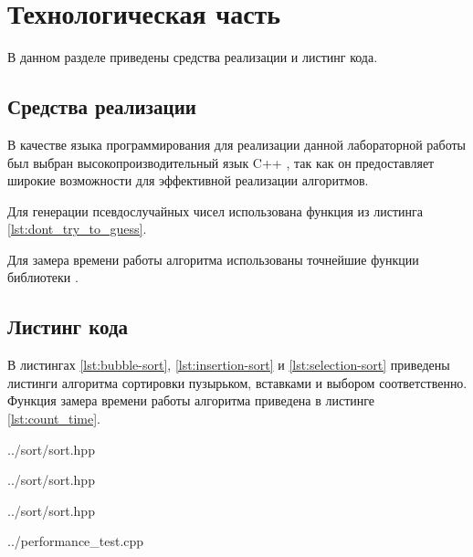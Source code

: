 \chapter{Технологическая часть}

В данном разделе приведены средства реализации и листинг кода.

\section{Средства реализации}

В качестве языка программирования для реализации данной лабораторной работы был выбран высокопроизводительный язык C++ \cite{cpp17}, так как он предоставляет широкие возможности для эффективной реализации алгоритмов.

Для генерации псевдослучайных чисел использована функция из листинга \ref{lst:dont_try_to_guess}.

Для замера времени работы алгоритма использованы точнейшие функции библиотеки .

\section{Листинг кода}

В листингах \ref{lst:bubble-sort}, \ref{lst:insertion-sort} и \ref{lst:selection-sort} приведены листинги алгоритма сортировки пузырьком, вставками и выбором соответственно.
Функция замера времени работы алгоритма приведена в листинге \ref{lst:count_time}.

\begin{lstinputlisting}[
	caption={Алгоритм сортировки пузырьком},
	label={lst:bubble-sort},
	style={cpp},
	linerange={9-18}
]{../sort/sort.hpp}
\end{lstinputlisting}

\begin{lstinputlisting}[
	caption={Алгоритм сортировки вставками},
	label={lst:insertion-sort},
	style={cpp},
	linerange={20-27}
]{../sort/sort.hpp}
\end{lstinputlisting}

\begin{lstinputlisting}[
	caption={Алгоритм сортировки выбором},
	label={lst:selection-sort},
	style={cpp},
	linerange={29-34}
]{../sort/sort.hpp}
\end{lstinputlisting}

\begin{lstinputlisting}[
	caption={Продвинутый генератор псевдослучайных чисел},
	label={lst:dont_try_to_guess},
	style={cpp},
	linerange={7-11}
]{../performance_test.cpp}
\end{lstinputlisting}

